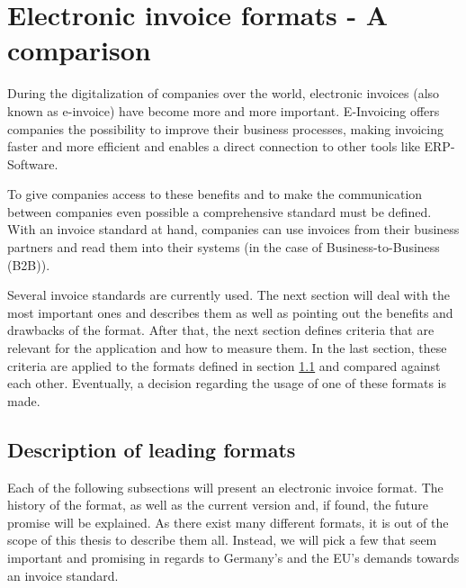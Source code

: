 %
% 
\chapter{Electronic invoice formats - A comparison}
\label{cha2}

During the digitalization of companies over the world, electronic invoices (also known as e-invoice) have become more and more important. E-Invoicing offers companies the possibility to improve their business processes, making invoicing faster and more efficient and enables a direct connection to other tools like ERP-Software. 

To give companies access to these benefits and to make the communication between companies even possible a comprehensive standard must be defined. With an invoice standard at hand, companies can use invoices from their business partners and read them into their systems (in the case of Business-to-Business (B2B)). 

Several invoice standards are currently used. The next section will deal with the most important ones and describes them as well as pointing out the benefits and drawbacks of the format.
After that, the next section defines criteria that are relevant for the application and how to measure them.
In the last section, these criteria are applied to the formats defined in section \ref{sec2.1} and compared against each other. Eventually, a decision regarding the usage of one of these formats is made.

\section{Description of leading formats}
\label{sec2.1}

Each of the following subsections will present an electronic invoice format. The history of the format, as well as the current version and, if found, the future promise will be explained. As there exist many different formats, it is out of the scope of this thesis to describe them all. %
Instead, we will pick a few that seem important and promising in regards to Germany's and the EU's demands towards an invoice standard. 

